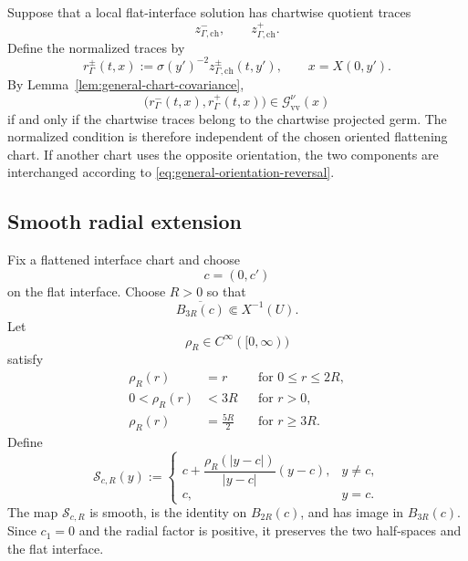 \documentclass[11pt]{amsart}
\numberwithin{equation}{section}
\theoremstyle{plain}
\theoremstyle{definition}
\theoremstyle{remark}
\begin{document}
Suppose that a local flat-interface solution has chartwise quotient traces
\[
    z_{\Gamma,\mathrm{ch}}^-,
    \qquad
    z_{\Gamma,\mathrm{ch}}^+.
\]
Define the normalized traces by
\begin{equation}
\label{eq:general-normalized-projected-traces}
    r_\Gamma^\pm(t,x)
    :=
    \sigma(y')^{-2}
    z_{\Gamma,\mathrm{ch}}^\pm(t,y'),
    \qquad
    x=X(0,y').
\end{equation}
By Lemma~\ref{lem:general-chart-covariance},
\begin{equation}
\label{eq:general-intrinsic-germ-condition}
    \bigl(
        r_\Gamma^-(t,x),
        r_\Gamma^+(t,x)
    \bigr)
    \in
    \mathcal G_{\mathrm{vv}}^\nu(x)
\end{equation}
if and only if the chartwise traces belong to the chartwise projected germ.
The normalized condition is therefore independent of the chosen oriented
flattening chart. If another chart uses the opposite orientation, the two
components are interchanged according to
\eqref{eq:general-orientation-reversal}.

\subsection{Smooth radial extension}
\label{subsec:general-radial-extension}

Fix a flattened interface chart and choose
\[
    c=(0,c')
\]
on the flat interface. Choose \(R>0\) so that
\begin{equation}
\label{eq:general-chart-radius}
    \overline{B_{3R}(c)}
    \Subset
    X^{-1}(U).
\end{equation}
Let
\[
    \rho_R\in C^\infty([0,\infty))
\]
satisfy
\begin{equation}
\label{eq:general-radial-profile}
\begin{aligned}
    \rho_R(r)&=r
    &&\text{for }0\le r\le2R,
\\
    0<\rho_R(r)&<3R
    &&\text{for }r>0,
\\
    \rho_R(r)&=\frac{5R}{2}
    &&\text{for }r\ge3R.
\end{aligned}
\end{equation}
Define
\begin{equation}
\label{eq:general-radial-compression}
\mathcal S_{c,R}(y)
:=
\begin{cases}
c+
\dfrac{\rho_R(|y-c|)}{|y-c|}
(y-c),
&y\neq c,
\\[2mm]
c,
&y=c.
\end{cases}
\end{equation}
The map \(\mathcal S_{c,R}\) is smooth, is the identity on \(B_{2R}(c)\),
and has image in \(B_{3R}(c)\). Since \(c_1=0\) and the radial factor is
positive, it preserves the two half-spaces and the flat interface.
\end{document}
